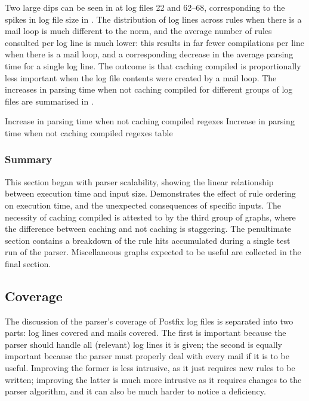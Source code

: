 
Two large dips can be seen in  at log files 22 and 62--68, corresponding
to the spikes in log file size in .  The distribution of log lines across rules when
there is a mail loop is much different to the norm, and the average number
of rules consulted per log line is much lower: this results in far fewer
\regex{} compilations per line when there is a mail loop, and a
corresponding decrease in the average parsing time for a single log line.
The outcome is that caching compiled \regexes{} is proportionally less
important when the log file contents were created by a mail loop.  The
increases in parsing time when not caching compiled \regexes{} for
different groups of log files are summarised in .

 {Increase in
parsing time when not caching compiled regexes} {Increase in parsing time
when not caching compiled regexes table}


\subsubsection{Summary}

This section began with parser scalability, showing the linear relationship
between execution time and input size.  Demonstrates the effect of rule
ordering on execution time, and the unexpected consequences of specific
inputs.  The necessity of caching compiled \regexes{} is attested to by the
third group of graphs, where the difference between caching and not caching
is staggering.  The penultimate section contains a breakdown of the rule
hits accumulated during a single test run of the parser.  Miscellaneous
graphs expected to be useful are collected in the final section.  

\subsection{Coverage}

\label{parsing coverage}

The discussion of the parser's coverage of Postfix log files is separated
into two parts: log lines covered and mails covered.  The first is
important because the parser should handle all (relevant) log lines it is
given; the second is equally important because the parser must properly
deal with every mail if it is to be useful.  Improving the former is
less intrusive, as it just requires new rules to be written; improving the
latter is much more intrusive as it requires changes to the parser
algorithm, and it can also be much harder to notice a deficiency.

